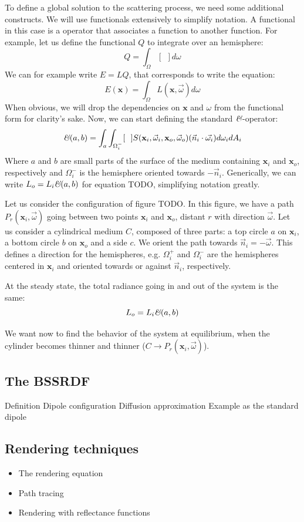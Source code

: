 To define a global solution to the scattering process, we need some additional constructs. We will use functionals extensively to simplify notation. A functional in this case is a operator that associates a function to another function. For example, let us define the functional $Q$ to integrate over an hemisphere:
$$
Q = \int_\Omega [\ \ ] d\omega
$$
We can for example write $E = LQ$, that corresponds to write the equation:
$$
E(\mathbf{x}) = \int_\Omega L(\mathbf{x}, \vec{\omega}) d\omega
$$
When obvious, we will drop the dependencies on $\mathbf{x}$ and $\omega$ from the functional form for clarity's sake. Now, we can start defining the standard $\textit{\text{\&}}$-operator:
$$
\textit{\text{\&}}(a,b) = \int_a \int_{\Omega_i^-} [\ \ ] S(\mathbf{x}_i, \vec{\omega}_i, \mathbf{x}_o, \vec{\omega}_o) (\vec{n}_i \cdot \vec{\omega_i}) d \omega_i d A_i
$$
Where $a$ and $b$ are small parts of the surface of the medium containing $\mathbf{x}_i$ and $\mathbf{x}_o$, respectively and $\Omega_i^-$ is the hemisphere oriented towards $-\vec{n}_i$. Generically, we can write $L_o = L_i \textit{\text{\&}}(a,b)$ for equation TODO, simplifying notation greatly.

Let us consider the configuration of figure TODO. In this figure, we have a path $P_r(\mathbf{x}_i,\vec{\omega})$ going between two points $\mathbf{x}_i$ and $\mathbf{x}_o$, distant $r$ with direction $\vec{\omega}$. Let us consider a  cylindrical medium $C$, composed of three parts: a top circle $a$ on $\mathbf{x}_i$, a bottom circle $b$ on $\mathbf{x}_o$ and a side $c$. We orient the path towards $\vec{n}_i = -\vec{\omega}$. This defines a direction for the hemispheres, e.g. $\Omega_i^+$ and $\Omega_i^-$ are the hemispheres centered in $\mathbf{x}_i$  and oriented towards or against $\vec{n}_i$, respectively. 

At the steady state, the total radiance going in and out of the system is the same:
$$
L_o = L_i \textit{\text{\&}}(a,b)
$$

We want now to find the behavior of the system at equilibrium, when the cylinder becomes thinner and thinner ($C\rightarrow P_r(\mathbf{x}_i,\vec{\omega})$).


\subsection{The BSSRDF}
Definition
Dipole configuration
Diffusion approximation
Example as the standard dipole

\subsection{Rendering techniques}
\begin{itemize}
\item The rendering equation
\item Path tracing
\item Rendering with reflectance functions
\end{itemize}

